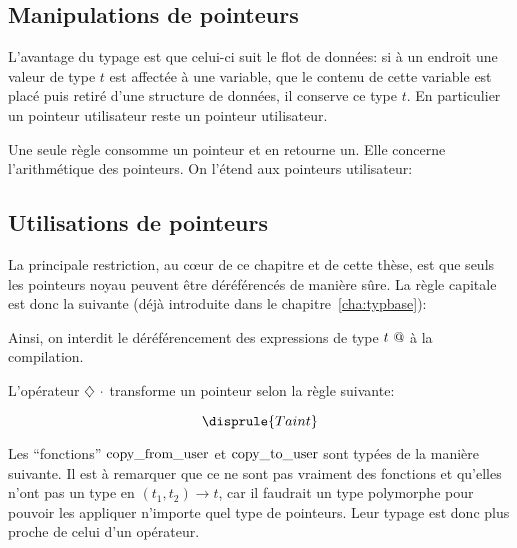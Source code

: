 \subsection*{Manipulations de pointeurs}

L'avantage du typage est que celui-ci suit le flot de données: si à un endroit
une valeur de type $t$ est affectée à une variable, que le contenu de cette
variable est placé puis retiré d'une structure de données, il conserve ce type
$t$. En particulier un pointeur utilisateur reste un pointeur utilisateur.

Une seule règle consomme un pointeur et en retourne un. Elle concerne
l'arithmétique des pointeurs. On l'étend aux pointeurs utilisateur:

\begin{mathpar}
\end{mathpar}

\subsection*{Utilisations de pointeurs}

La principale restriction, au cœur de ce chapitre et de cette thèse, est que
seuls les pointeurs noyau peuvent être déréférencés de manière sûre. La règle
capitale est donc la suivante (déjà introduite dans le
chapitre~\ref{cha:typbase}):

\begin{mathpar}
\end{mathpar}

Ainsi, on interdit le déréférencement des expressions de type $\ptrU{t}$ à la
compilation.


L'opérateur $\eTaint{\cdot}$ transforme un pointeur selon la règle suivante:

\[
    \disprule{Taint}
\]

Les ``fonctions'' $\cfuF$ et $\ctuF$ sont typées de la manière suivante. Il est
à remarquer que ce ne sont pas vraiment des fonctions et qu'elles n'ont pas un
type en $(t_1, t_2) → t$, car il faudrait un type polymorphe pour pouvoir les
appliquer n'importe quel type de pointeurs. Leur typage est donc plus proche de
celui d'un opérateur.

\begin{mathpar}

\end{mathpar}

